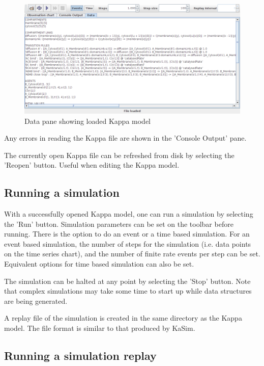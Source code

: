 \begin{figure}[h!]
 \centering
 \includegraphics[scale=0.3]{./images/FileOpenDataPane.png}
 \caption{Data pane showing loaded Kappa model}
 \label{fig:dataPane}
\end{figure}

Any errors in reading the Kappa file are shown in the 'Console Output' pane.

The currently open Kappa file can be refreshed from disk by selecting the 'Reopen' button. Useful when editing the Kappa model.

\subsection{Running a simulation}

With a successfully opened Kappa model, one can run a simulation by selecting the 'Run' button. Simulation parameters can be set on the toolbar before running. There is the option to do an event or a time based simulation. For an event based simulation, the number of steps for the simulation (i.e. data points on the time series chart), and the number of finite rate events per step can be set. Equivalent options for time based simulation can also be set.

The simulation can be halted at any point by selecting the 'Stop' button. Note that complex simulations may take some time to start up while data structures are being generated.

A replay file of the simulation is created in the same directory as the Kappa model. The file format is similar to that produced by KaSim.

\subsection{Running a simulation replay}


